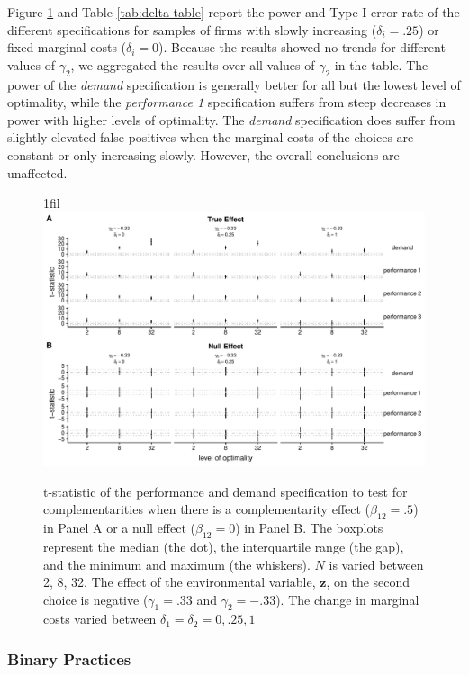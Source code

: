 \documentclass[12pt]{article}
\makeatletter
\newcommand*{\centerfloat}{%
  \parindent \z@
  \leftskip \z@ \@plus 1fil \@minus \textwidth
  \rightskip\leftskip
  \parfillskip \z@skip}
\makeatother
\begin{document}
Figure \ref{delta} and Table \ref{tab:delta-table} report the power and Type I error rate of the different specifications for samples of firms with slowly increasing ($\delta_i = .25$) or fixed marginal costs ($\delta_i = 0$). Because the results showed no trends for different values of $\gamma_2$, we aggregated the results over all values of $\gamma_2$ in the table. The power of the \emph{demand} specification is generally better for all but the lowest level of optimality, while the \emph{performance 1} specification suffers from steep decreases in power with higher levels of optimality. The \emph{demand} specification does suffer from slightly elevated false positives when the marginal costs of the choices are constant or only increasing slowly. However, the overall conclusions are unaffected.

\begin{figure}
\centerfloat
\includegraphics[width=450px]{figure-latex/delta_new_plot.pdf}
\caption[The Error Rate and Power with Different Levels of Marginal Costs]
{\label{delta} t-statistic of the performance and demand specification to test
for complementarities when there is a complementarity effect ($\beta_{12} = .5$)
in Panel A or a null effect ($\beta_{12} = 0$) in Panel B. The boxplots represent the median (the dot), the interquartile range (the gap), and the minimum and maximum (the whiskers). $N$ is varied between 2, 8, 32. The effect of the environmental variable, $\mathbf{z}$, on the second choice is negative ($\gamma_1 = .33$ and $\gamma_2 = -.33$). The change in marginal costs varied between $\delta_1 = \delta_2 = 0, .25, 1$}
\end{figure}



\subsubsection{Binary Practices}\label{binary-practices}
\end{document}
